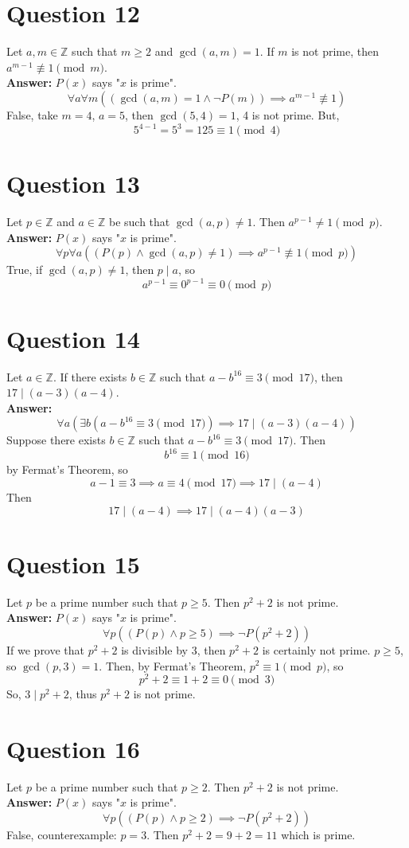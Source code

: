 \documentclass[openany]{report}
\begin{document}
\section{Question 12}
Let $a,m \in \mathbb{Z}$ such that $m \geq 2$ and $\gcd(a,m) = 1$. If $m$ is not prime, then $a^{m-1}\not\equiv 1 \pmod{m}$. \\[2ex]
\textbf{Answer:} 
$P(x)$ says "$x$ is prime".
\[\forall a \forall m ((\gcd(a,m) = 1 \wedge \neg P(m)) \implies a^{m-1}\not\equiv 1 )\]
False, take $m = 4$, $ a =5$, then $\gcd(5,4) = 1$, 4 is not prime. But, 
\[    5^{4-1} = 5^3 = 125 \equiv 1 \pmod{4}\]
\section{Question 13}
Let $p \in \mathbb{Z}$ and $ a \in \mathbb{Z}$ be such that $\gcd(a,p) \neq 1$. Then $a^{p-1} \neq 1 \pmod{p}$. \\[2ex]
\textbf{Answer:} $P(x)$ says "$x$ is prime".
\[\forall p \forall a ((P(p) \wedge \gcd(a,p) \neq 1 ) \implies a^{p-1} \not\equiv 1 \pmod{p})\]
True, if $\gcd(a,p) \neq 1$, then $p \mid a$, so 
\[a^{p-1} \equiv 0^{p-1} \equiv 0 \pmod{p} \]
\section{Question 14}
Let $a \in \mathbb{Z}$. If there exists $b \in \mathbb{Z}$ such that $a-b^{16} \equiv 3 \pmod{17}$, then $17 \mid (a-3)(a-4)$. \\[2ex]
\textbf{Answer:}
\[\forall a( \exists b( a- b^{16} \equiv 3 \pmod{17}) \implies 17 \mid (a-3)(a-4))\]
Suppose there exists $b \in \mathbb{Z}$ such that $a-b^{16} \equiv 3 \pmod{17}$. Then
\[b^{16} \equiv 1 \pmod{16}\]
by Fermat's Theorem, so 
\[a - 1 \equiv 3 \implies a \equiv 4 \pmod{17} \implies 17 \mid (a-4)\]
Then 
\[17 \mid (a-4) \implies 17 \mid (a-4)(a-3)\]
\section{Question 15}
Let $p$ be a prime number such that $p \geq 5$. Then $p^2 + 2$ is not prime. \\[2ex]
\textbf{Answer:} $P(x)$ says "$x$ is prime".
\[\forall p ((P(p) \wedge p \geq 5) \implies \neg P(p^2 + 2))\]
If we prove that $p^2 + 2$ is divisible by 3, then $p^2 + 2$ is certainly not prime.  $p \geq 5$, so $\gcd(p,3) = 1$. Then, by Fermat's Theorem, $p^2 \equiv 1 \pmod{p}$, so
\[p^2 + 2 \equiv 1 + 2 \equiv 0 \pmod{3}\]
So, $3 \mid p^2 + 2$, thus $p^2 + 2$ is not prime.
\section{Question 16}
Let $p$ be a prime number such that $p \geq 2$. Then $p^2 + 2$ is not prime. \\[2ex]
\textbf{Answer:} $P(x)$ says "$x$ is prime".
\[\forall p ((P(p) \wedge p \geq 2) \implies \neg P(p^2 + 2))\]
False, counterexample: $p = 3$. Then $p^2 + 2 = 9 + 2 = 11$ which is prime.
\end{document}

